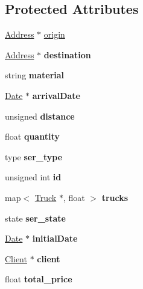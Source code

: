 \subsection*{Protected Attributes}
\begin{DoxyCompactItemize}
\item 
\hyperlink{class_address}{Address} $\ast$ \hyperlink{class_service_a4abd0a104d97e5bdb8e8ca93bab31ce7}{origin}
\item 
\mbox{\label{class_service_adf346b71b98618cf84e5d0a0eca2ee1e}} 
\hyperlink{class_address}{Address} $\ast$ {\bfseries destination}
\item 
\mbox{\label{class_service_a04a4efb2434d7c4acb7c43bfef2d9c52}} 
string {\bfseries material}
\item 
\mbox{\label{class_service_a1e1bdf965c61c9d52c6992beb5594032}} 
\hyperlink{class_date}{Date} $\ast$ {\bfseries arrival\+Date}
\item 
\mbox{\label{class_service_ad183cae7d3eeb78860669d209f4e7387}} 
unsigned {\bfseries distance}
\item 
\mbox{\label{class_service_afef38ab183af6a2b6fba08400c9eb987}} 
float {\bfseries quantity}
\item 
\mbox{\label{class_service_acb458e8692722cfba06273fb938c2bf8}} 
type {\bfseries ser\+\_\+type}
\item 
\mbox{\label{class_service_adae62762a30190e27f24e40c7dbebae5}} 
unsigned int {\bfseries id}
\item 
\mbox{\label{class_service_ae12ab1df142b74c305fb2eb32b05ad85}} 
map$<$ \hyperlink{class_truck}{Truck} $\ast$, float $>$ {\bfseries trucks}
\item 
\mbox{\label{class_service_ae0321f4e4847e9e413910831262c89c4}} 
state {\bfseries ser\+\_\+state}
\item 
\mbox{\label{class_service_a16f7facc8c1f9dd5ad1a58750e20aea1}} 
\hyperlink{class_date}{Date} $\ast$ {\bfseries initial\+Date}
\item 
\mbox{\label{class_service_ac7249f01861124261b7b4b23bb27ab3e}} 
\hyperlink{class_client}{Client} $\ast$ {\bfseries client}
\item 
\mbox{\label{class_service_a9aad689e8f65b495425fda35cf5662ed}} 
float {\bfseries total\+\_\+price}
\end{DoxyCompactItemize}
